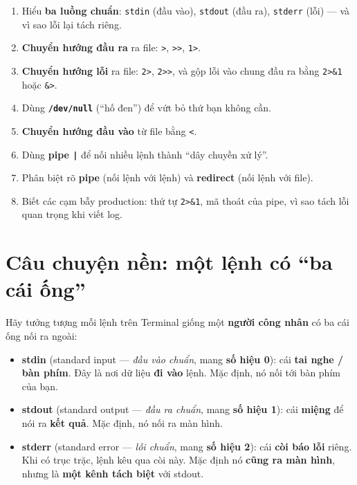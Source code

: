 \documentclass[12pt,a4paper]{article}
\newcommand{\cmd}[1]{\texttt{#1}}
\begin{document}
\begin{enumerate}[leftmargin=2em]
\item Hiểu \textbf{ba luồng chuẩn}: \cmd{stdin} (đầu vào), \cmd{stdout} (đầu ra), \cmd{stderr} (lỗi) --- và vì sao lỗi lại tách riêng.
\item \textbf{Chuyển hướng đầu ra} ra file: \cmd{>}, \cmd{>>}, \cmd{1>}.
\item \textbf{Chuyển hướng lỗi} ra file: \cmd{2>}, \cmd{2>>}, và gộp lỗi vào chung đầu ra bằng \cmd{2>\&1} hoặc \cmd{\&>}.
\item Dùng \textbf{\cmd{/dev/null}} (``hố đen'') để vứt bỏ thứ bạn không cần.
\item \textbf{Chuyển hướng đầu vào} từ file bằng \cmd{<}.
\item Dùng \textbf{pipe \cmd{|}} để nối nhiều lệnh thành ``dây chuyền xử lý''.
\item Phân biệt rõ \textbf{pipe} (nối lệnh với lệnh) và \textbf{redirect} (nối lệnh với file).
\item Biết các cạm bẫy production: thứ tự \cmd{2>\&1}, mã thoát của pipe, vì sao tách lỗi quan trọng khi viết log.
\end{enumerate}

\section{Câu chuyện nền: một lệnh có ``ba cái ống''}

Hãy tưởng tượng mỗi lệnh trên Terminal giống một \textbf{người công nhân} có ba cái ống nối ra ngoài:

\begin{itemize}[leftmargin=1.4em]
\item \textbf{stdin} (standard input --- \textit{đầu vào chuẩn}, mang \textbf{số hiệu 0}): cái \textbf{tai nghe / bàn phím}. Đây là nơi dữ liệu \textbf{đi vào} lệnh. Mặc định, nó nối tới bàn phím của bạn.
\item \textbf{stdout} (standard output --- \textit{đầu ra chuẩn}, mang \textbf{số hiệu 1}): cái \textbf{miệng} để nói ra \textbf{kết quả}. Mặc định, nó nối ra màn hình.
\item \textbf{stderr} (standard error --- \textit{lỗi chuẩn}, mang \textbf{số hiệu 2}): cái \textbf{còi báo lỗi} riêng. Khi có trục trặc, lệnh kêu qua còi này. Mặc định nó \textbf{cũng ra màn hình}, nhưng là \textbf{một kênh tách biệt} với stdout.
\end{itemize}
\end{document}
